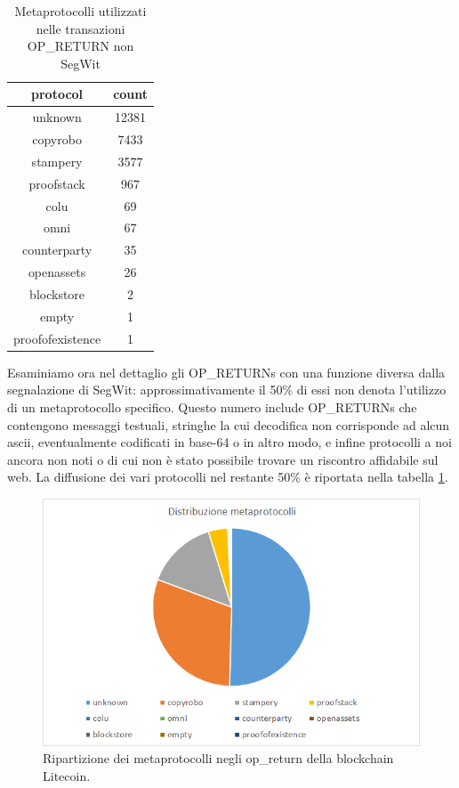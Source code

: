 \begin{table}
\begin{tabular}{|c|c|}
	\hline 
	\textbf{protocol}& \textbf{count}  \\ 
	\hline 
unknown	&  12381\\ 
	\hline 
copyrobo	&  7433\\ 
	\hline 
stampery	& 3577 \\ 
	\hline 
proofstack	& 967 \\ 
	\hline 
colu	& 69 \\ 
	\hline 
omni	& 67 \\ 
	\hline 
counterparty	& 35 \\ 
	\hline 
openassets	& 26 \\ 
	\hline 
blockstore	& 2 \\ 
	\hline 
empty	& 1 \\ 
	\hline 
proofofexistence	& 1 \\ 
	\hline 
\end{tabular}
\caption{Metaprotocolli utilizzati nelle transazioni OP\_RETURN non SegWit}
\label{protocols}
\end{table}

Esaminiamo ora nel dettaglio gli OP\_RETURNs con una funzione diversa dalla segnalazione di SegWit: approssimativamente il 50\% di essi non denota l’utilizzo di un metaprotocollo specifico. Questo numero include OP\_RETURNs che contengono messaggi testuali, stringhe la cui decodifica non corrisponde ad alcun ascii, eventualmente codificati in base-64 o in altro modo, e infine protocolli a noi ancora non noti o di cui non è stato possibile trovare un riscontro affidabile sul web.
La diffusione dei vari protocolli nel restante 50\% è riportata nella tabella \ref{protocols}.

\begin{figure}
	\centering
	\includegraphics[width=1.0\linewidth]{images/distribuzioneopreturn}
	\caption{Ripartizione dei metaprotocolli negli op\_return della blockchain Litecoin.}
	\label{fig:distribuzioneopreturn}
\end{figure}


